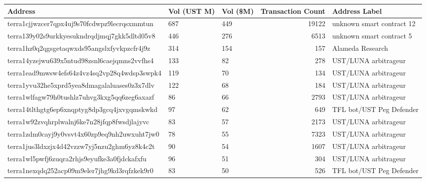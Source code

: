 
\begin{center}
    {\scriptsize
        \begin{tabular}{lllrl}
            \toprule
            Address                                      & Vol (UST M) & Vol (\$M) & Transaction Count & Address Label             \\
            \midrule
            terra1cjjwzcer7qpx4uj9s70fcdwpz9lecrqsxmmtun & 687         & 449       & 19122             & unknown smart contract 12 \\
            terra139y02s9urkkyesukndrqdjmqj7gkk5dltd05v8 & 446         & 276       & 6513              & unknown smart contract 5  \\
            terra1hz0q2qgsgetaqwxds95angslxfyvkpzcfr4j9z & 314         & 154       & 157               & Alameda Research          \\
            terra14yzejwu639x5ntud98zsnl6caejqmns2vvfhs4 & 133         & 82        & 278               & UST/LUNA arbitrageur      \\
            terra1ead9mwsw4efs64z4vz4sq2vp28q4wdsp3swpk4 & 119         & 70        & 134               & UST/LUNA arbitrageur      \\
            terra1yvu32he5xprd5yea8dmagalaluases0z3x7dlv & 122         & 68        & 184               & UST/LUNA arbitrageur      \\
            terra1wlfagw79h0tushlz7uhvg3kxg5qq6zeg6axazf & 86          & 66        & 2793              & UST/LUNA arbitrageur      \\
            terra14tlthgtg6ep6xnqptyg8dp3gcq4jxvgqmskwkd & 97          & 62        & 649               & TFL bot/UST Peg Defender  \\
            terra1w92zvqhrplwalnj6ke7n28jfqp8fwsdjlajyvc & 83          & 57        & 2173              & UST/LUNA arbitrageur      \\
            terra1zdm0cayj9y0vsvt4x60zp9eq9nh2uwxuht7jw0 & 78          & 55        & 7323              & UST/LUNA arbitrageur      \\
            terra1jus3ldxzjx4d42vzzw7yj5nzu2ghm6yz8k4c2t & 90          & 54        & 1607              & UST/LUNA arbitrageur      \\
            terra1wl5pwfj6zuqra2rhjs9eyufke3a0fjdckafxfu & 96          & 51        & 304               & UST/LUNA arbitrageur      \\
            terra1nexqdq252acp09m9eler7jhg9kd3rqfzkek9r0 & 83          & 50        & 526               & TFL bot/UST Peg Defender  \\

\end{tabular}}
\end{center}
